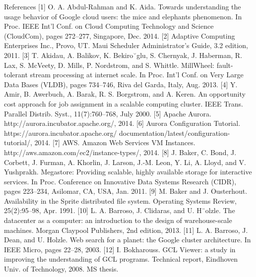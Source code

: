 References
[1] O. A. Abdul-Rahman and K. Aida. Towards understanding
the usage behavior of Google cloud users: the mice and
elephants phenomenon. In Proc. IEEE Int’l Conf. on Cloud
Computing Technology and Science (CloudCom), pages
272–277, Singapore, Dec. 2014.
[2] Adaptive Computing Enterprises Inc., Provo, UT. Maui
Scheduler Administrator’s Guide, 3.2 edition, 2011.
[3] T. Akidau, A. Balikov, K. Bekiro˘glu, S. Chernyak,
J. Haberman, R. Lax, S. McVeety, D. Mills, P. Nordstrom,
and S. Whittle. MillWheel: fault-tolerant stream processing
at internet scale. In Proc. Int’l Conf. on Very Large Data
Bases (VLDB), pages 734–746, Riva del Garda, Italy, Aug.
2013.
[4] Y. Amir, B. Awerbuch, A. Barak, R. S. Borgstrom, and
A. Keren. An opportunity cost approach for job assignment
in a scalable computing cluster. IEEE Trans. Parallel Distrib.
Syst., 11(7):760–768, July 2000.
[5] Apache Aurora.
http://aurora.incubator.apache.org/, 2014.
[6] Aurora Configuration Tutorial.
https://aurora.incubator.apache.org/
documentation/latest/configuration-tutorial/,
2014.
[7] AWS. Amazon Web Services VM Instances.
http://aws.amazon.com/ec2/instance-types/, 2014.
[8] J. Baker, C. Bond, J. Corbett, J. Furman, A. Khorlin,
J. Larson, J.-M. Leon, Y. Li, A. Lloyd, and V. Yushprakh.
Megastore: Providing scalable, highly available storage for
interactive services. In Proc. Conference on Innovative Data
Systems Research (CIDR), pages 223–234, Asilomar, CA,
USA, Jan. 2011.
[9] M. Baker and J. Ousterhout. Availability in the Sprite
distributed file system. Operating Systems Review,
25(2):95–98, Apr. 1991.
[10] L. A. Barroso, J. Clidaras, and U. H¨olzle. The datacenter as
a computer: an introduction to the design of warehouse-scale
machines. Morgan Claypool Publishers, 2nd edition, 2013.
[11] L. A. Barroso, J. Dean, and U. Holzle. Web search for a
planet: the Google cluster architecture. In IEEE Micro, pages
22–28, 2003.
[12] I. Bokharouss. GCL Viewer: a study in improving the
understanding of GCL programs. Technical report,
Eindhoven Univ. of Technology, 2008. MS thesis.

